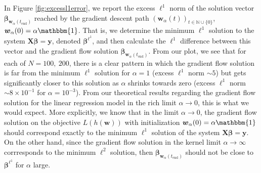 \documentclass{article}
\begin{document}
In Figure \ref{fig:excessl1error}, we report the excess $\ell^1$ norm of the solution vector $\boldsymbol{\beta}_{\boldsymbol{w}_{\alpha}(t_{\text{end}})}$ reached by the gradient descent path $(\boldsymbol{w}_{\alpha}(t))_{t \in \mathbb{N}\cup \{0\}}$, $\boldsymbol{w}_{\alpha}(0) = \alpha \mathbbm{1}$. That is, we determine the minimum $\ell^1$ solution to the system $\boldsymbol{X} \boldsymbol{\beta} = \boldsymbol{y}$, denoted $\boldsymbol{\beta}^{\ell^1}$, and then calculate the $\ell^1$ difference between this vector and the gradient flow solution $\boldsymbol{\beta}_{\boldsymbol{w}_{\alpha}(t_{\text{end}})}$. From our plot, we see that for each of $N= 100, \ 200$, there is a clear pattern in which the gradient flow solution is far from the minimum $\ell^1$ solution for $\alpha =1$ (excess $\ell^1$ norm $\sim5$) but gets significantly closer to this solution as $\alpha$ shrinks towards zero (excess $\ell^1$ norm $\sim 8\times 10^{-1}$ for $\alpha = 10^{-3}$). From our theoretical results regarding the gradient flow solution for the linear regression model in the rich limit $\alpha \rightarrow 0$, this is what we would expect. More explicitly, we know that in the limit $\alpha \rightarrow 0$, the gradient flow solution on the objective $L(h(\boldsymbol{w}))$ with initialization $\boldsymbol{w}_{\alpha}(0) = \alpha \mathbbm{1}$ should correspond exactly to the minimum $\ell^1$ solution of the system $\boldsymbol{X} \boldsymbol{\beta} = \boldsymbol{y}$. On the other hand, since the gradient flow solution in the kernel limit $\alpha \rightarrow \infty$ corrresponds to the minimum $\ell^2$ solution, then $\boldsymbol{\beta}_{\boldsymbol{w}_{\alpha}(t_{\text{end}})}$ should not be close to $\boldsymbol{\beta}^{\ell^1}$ for $\alpha$ large.
\end{document}
